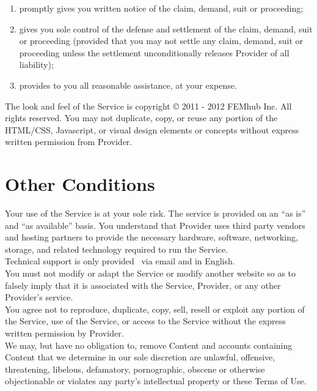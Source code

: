 \documentclass{article}
\begin{document}
\begin{enumerate}
\item promptly gives you written notice of the claim, demand, suit or proceeding; 
\item gives you sole control of the defense and settlement of the claim, demand, 
      suit or proceeding (provided that you may not settle any claim, demand, 
      suit or proceeding unless the settlement unconditionally releases Provider 
      of all liability); 
\item provides to you all reasonable assistance, at your expense.
\end{enumerate}
The look and feel of the Service is copyright © 2011 - 2012 FEMhub Inc. All rights reserved. You may not duplicate, copy, or reuse any portion of the HTML/CSS, Javascript, or visual design elements or concepts without express written permission from Provider.\\

\section{Other Conditions}

Your use of the Service is at your sole risk. The service is provided on an “as is” and “as available” basis. You understand that Provider uses third party vendors and hosting partners to provide the necessary hardware, software, networking, storage, and related technology required to run the Service. \\

\noindent
Technical support is only provided  via email and in English. \\

\noindent 
You must not modify or adapt the Service or modify another website so as to falsely imply that it is associated with the Service, Provider, or any other Provider’s service.\\

\noindent 
You agree not to reproduce, duplicate, copy, sell, resell or exploit any portion of the Service, use of the Service, or access to the Service without the express written permission by Provider.\\

\noindent 
We may, but have no obligation to, remove Content and accounts containing Content that we determine in our sole discretion are unlawful, offensive, threatening, libelous, defamatory, pornographic, obscene or otherwise objectionable or violates any party’s intellectual property or these Terms of Use.\\
\end{document}

